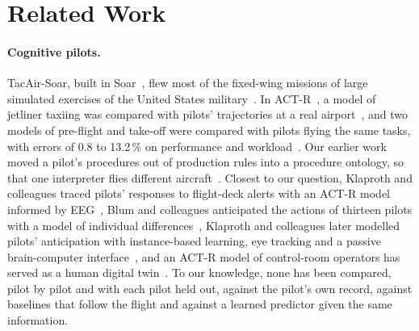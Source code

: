 \documentclass{llncs}
\begin{document}
\section{Related Work}

\paragraph{Cognitive pilots.} TacAir-Soar, built in Soar~\cite{laird2012soar}, flew most of the fixed-wing missions of large
simulated exercises of the United States military~\cite{jones_tacair_1999}. In ACT-R~\cite{anderson2004integrated,ritter2019actr}, a
model of jetliner taxiing was compared with pilots' trajectories at a real airport~\cite{zemla_2011_actr_taxiing}, and two models of
pre-flight and take-off were compared with
pilots flying the same tasks, with errors of 0.8 to 13.2\,\% on performance and workload~\cite{xu_computational_2024}. Our earlier work moved a pilot's procedures out of production rules into a
procedure ontology, so that one interpreter flies different aircraft~\cite{kengne_cpilot_2026}. Closest to our question, Klaproth and
colleagues traced pilots' responses to flight-deck alerts with an ACT-R model informed by EEG~\cite{klaproth_neuroadaptive_2020}, Blum and
colleagues anticipated the actions of thirteen pilots with a model of individual differences~\cite{blum_anticipation_2022}, Klaproth
and colleagues later modelled pilots' anticipation with instance-based learning, eye tracking and a passive brain-computer
interface~\cite{klaproth_anticipation_2024}, and an ACT-R model of
control-room operators has served as a human digital twin~\cite{balaji_digital_twin_2023}. To our knowledge, none has been compared, pilot
by pilot and with each pilot held out, against the pilot's own record, against baselines that follow the flight and against a learned
predictor given the same information.
\end{document}
